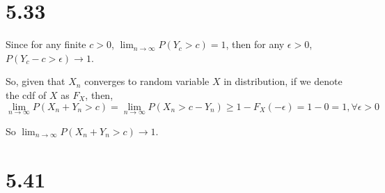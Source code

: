 \documentclass[letterpaper]{article}
\begin{document}
    \section*{5.33}
    Since for any finite $c > 0$, $\lim_{n\to\infty} P(Y_c > c) = 1$,
    then for any $\epsilon > 0$, $P(Y_c - c > \epsilon) \to 1$.

    So, given that $X_n$ converges to random variable $X$ in distribution, if we denote the cdf of $X$ as $F_X$, then,
    \[
    \lim_{n\to\infty} P(X_n + Y_n > c) = \lim_{n\to\infty} P(X_n > c - Y_n)  \ge 1 - F_X(-\epsilon) = 1 - 0 = 1, \forall \epsilon > 0
    \]

    So $\lim_{n\to\infty} P(X_n + Y_n > c) \to 1$.
    
    \section*{5.41}
\end{document}
